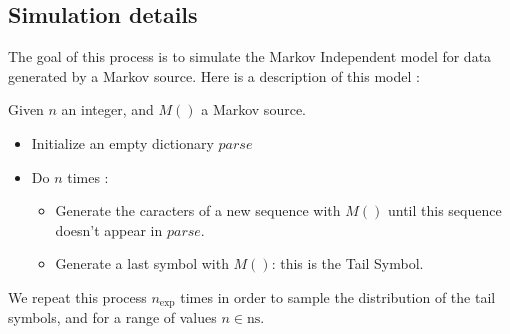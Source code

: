 
\subsection{Simulation details}

The goal of this process is to simulate the Markov Independent model
for data generated by a Markov source. Here is a description of this 
model :

Given $n$ an integer, and $M()$ a Markov source.

\begin{itemize}
    \item Initialize an empty dictionary $parse$ \\
    \item Do $n$ times :
        \begin{itemize} 
            \item Generate the caracters of a new sequence with $M()$ until 
                  this sequence doesn't appear in $parse$. \\
            \item Generate a last symbol with $M()$: this is the Tail
                  Symbol.
        \end{itemize}
\end{itemize}

We repeat this process $n_{\text{exp}}$ times in order to sample the 
distribution of the tail symbols, and for a range of values $n \in \text{ns}$.